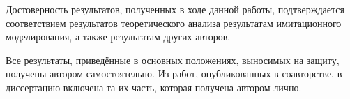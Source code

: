 {\reliability} Достоверность результатов, полученных в ходе данной работы, подтверждается соответствием результатов теоретического анализа  результатам имитационного моделирования, а также результатам других авторов.

{\probation}

{\contribution} Все результаты, приведённые в основных положениях, выносимых на защиту, получены автором самостоятельно. Из работ, опубликованных в соавторстве, в диссертацию включена та их часть, которая получена автором лично.

\begin{comment}
{\passconf} Содержание диссертации соответствует паспорту научной специальности \thesisSpecialtyTwoNumber – \thesisSpecialtyTwoTitle, по пунктам:
\begin{description}
	\item[П.2] Исследование процессов генерации, представления, передачи, хранения и отображения аналоговой, цифровой, видео-, аудио- и мультимедиа информации; разработка рекомендаций по совершенствованию и созданию новых соответствующих алгоритмов и процедур;
	\item[П.8] Исследование и разработка новых сигналов, модемов, кодеков, мультиплексоров и селекторов, обеспечивающих высокую надёжность обмена информацией в условиях воздействия внешних и внутренних помех;
	\item[П.11] Разработка научно-технических основ технологии создания сетей, систем и устройств телекоммуникаций и обеспечения их эффективного функционирования.
\end{description}
\end{comment}

